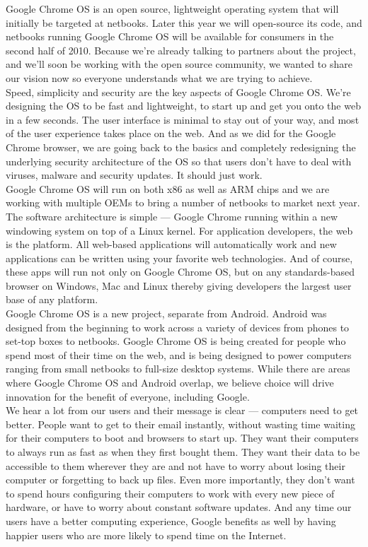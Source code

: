 \documentclass{article}
\begin{document}
	Google Chrome OS is an open source, lightweight operating system that will initially be targeted at netbooks. Later this year we will open-source its code, and netbooks running Google Chrome OS will be available for consumers in the second half of 2010. Because we're already talking to partners about the project, and we'll soon be working with the open source community, we wanted to share our vision now so everyone understands what we are trying to achieve.\\ 

	Speed, simplicity and security are the key aspects of Google Chrome OS. We're designing the OS to be fast and lightweight, to start up and get you onto the web in a few seconds. The user interface is minimal to stay out of your way, and most of the user experience takes place on the web. And as we did for the Google Chrome browser, we are going back to the basics and completely redesigning the underlying security architecture of the OS so that users don't have to deal with viruses, malware and security updates. It should just work.\\ 

	Google Chrome OS will run on both x86 as well as ARM chips and we are working with multiple OEMs to bring a number of netbooks to market next year. The software architecture is simple — Google Chrome running within a new windowing system on top of a Linux kernel. For application developers, the web is the platform. All web-based applications will automatically work and new applications can be written using your favorite web technologies. And of course, these apps will run not only on Google Chrome OS, but on any standards-based browser on Windows, Mac and Linux thereby giving developers the largest user base of any platform. \\ 

	Google Chrome OS is a new project, separate from Android. Android was designed from the beginning to work across a variety of devices from phones to set-top boxes to netbooks. Google Chrome OS is being created for people who spend most of their time on the web, and is being designed to power computers ranging from small netbooks to full-size desktop systems. While there are areas where Google Chrome OS and Android overlap, we believe choice will drive innovation for the benefit of everyone, including Google. \\ 

	We hear a lot from our users and their message is clear — computers need to get better. People want to get to their email instantly, without wasting time waiting for their computers to boot and browsers to start up. They want their computers to always run as fast as when they first bought them. They want their data to be accessible to them wherever they are and not have to worry about losing their computer or forgetting to back up files. Even more importantly, they don't want to spend hours configuring their computers to work with every new piece of hardware, or have to worry about constant software updates. And any time our users have a better computing experience, Google benefits as well by having happier users who are more likely to spend time on the Internet. \\ 
\end{document}
